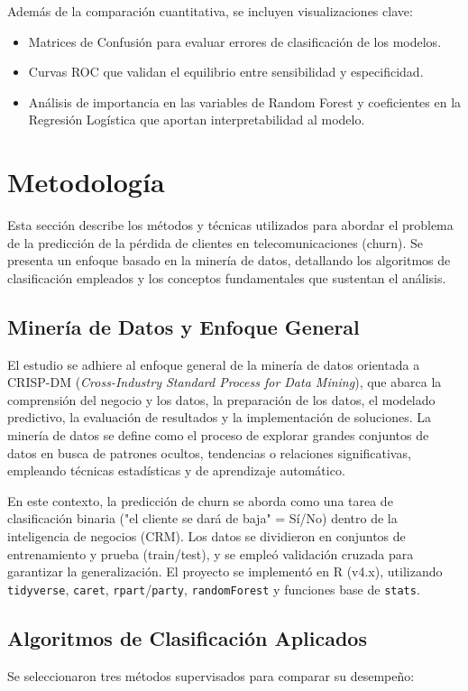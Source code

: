 \documentclass[conference]{IEEEtran}
\begin{document}
Además de la comparación cuantitativa, se incluyen visualizaciones clave:
\begin{itemize}
	\item Matrices de Confusión para evaluar errores de clasificación de los modelos.
	\item Curvas ROC que validan el equilibrio entre sensibilidad y especificidad.
	\item Análisis de importancia en las variables de Random Forest y coeficientes en la Regresión Logística que aportan interpretabilidad al modelo.
\end{itemize}

\FloatBarrier
\section{Metodología}
Esta sección describe los métodos y técnicas utilizados para abordar el problema de la predicción de la pérdida de clientes en telecomunicaciones (churn). Se presenta un enfoque basado en la minería de datos, detallando los algoritmos de clasificación empleados y los conceptos fundamentales que sustentan el análisis.

\subsection{Minería de Datos y Enfoque General}
El estudio se adhiere al enfoque general de la minería de datos orientada a CRISP-DM (\emph{Cross-Industry Standard Process for Data Mining}), que abarca la comprensión del negocio y los datos, la preparación de los datos, el modelado predictivo, la evaluación de resultados y la implementación de soluciones. La minería de datos se define como el proceso de explorar grandes conjuntos de datos en busca de patrones ocultos, tendencias o relaciones significativas, empleando técnicas estadísticas y de aprendizaje automático.

En este contexto, la predicción de churn se aborda como una tarea de clasificación binaria ("el cliente se dará de baja" = Sí/No) dentro de la inteligencia de negocios (CRM). Los datos se dividieron en conjuntos de entrenamiento y prueba (train/test), y se empleó validación cruzada para garantizar la generalización. El proyecto se implementó en R (v4.x), utilizando \texttt{tidyverse}, \texttt{caret}, \texttt{rpart}/\texttt{party}, \texttt{randomForest} y funciones base de \texttt{stats}.

\subsection{Algoritmos de Clasificación Aplicados}
Se seleccionaron tres métodos supervisados para comparar su desempeño:
\end{document}
